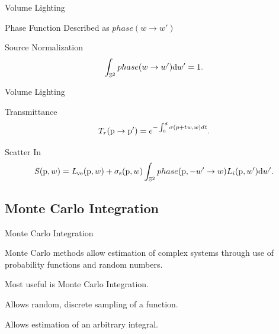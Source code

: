 \documentclass[compress,professionalfont]{beamer}
\begin{document}
\begin{frame}{Volume Lighting}

    \begin{block}{Phase Function}
        Described as $phase(w \to w')$
    \end{block}

    \begin{block}{Source Normalization}
        \[
            \int_{\mathbb{S}^2}phase(w \to w')\textup{d}w' = 1.
        \]
    \end{block}

\end{frame}




\begin{frame}{Volume Lighting}

    \begin{block}{Transmittance}
        \[
            T_{r}(\textup{p} \to \textup{p}') = e^{-\int_{0}^{d}\sigma (p+t\mathit{w},\mathit{w})d\mathit{t}}.
        \]
    \end{block}

    \begin{block}{Scatter In}
        \[
            \mathit{S}(\textup{p},w) = \mathit{L}_{\textup{ve}}(\textup{p},w) + \sigma_{\textup{s}}(\textup{p}, w) \int_{\mathbb{S}^2} phase(\textup{p}, -w' \to w) L_{i}(\textup{p},w')\textup{d}w'.
        \]
    \end{block}

\end{frame}




\subsection{Monte Carlo Integration}
\begin{frame}{Monte Carlo Integration}

    Monte Carlo methods allow estimation of complex systems through use of probability functions and random numbers.

    Most useful is Monte Carlo Integration.

    Allows random, discrete sampling of a function.

    Allows estimation of an arbitrary integral.

\end{frame}
\end{document}
